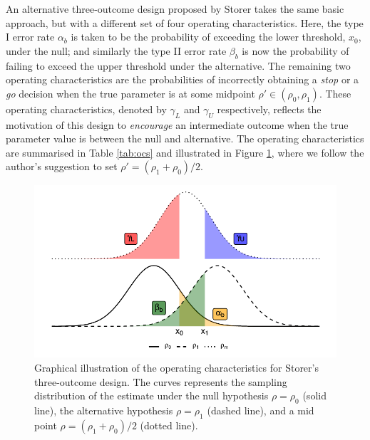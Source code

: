 \documentclass{bmcart}
\begin{document}
An alternative three-outcome design proposed by Storer \cite{Storer1992} takes the same basic approach, but with a different set of four operating characteristics. Here, the type I error rate $\alpha_b$ is taken to be the probability of exceeding the lower threshold, $x_0$, under the null; and similarly the type II error rate $\beta_b$ is now the probability of failing to exceed the upper threshold under the alternative. The remaining two operating characteristics are the probabilities of incorrectly obtaining a \emph{stop} or a \emph{go} decision when the true parameter is at some midpoint $\rho' \in (\rho_0, \rho_1)$. These operating characteristics, denoted by $\gamma_L$ and $\gamma_U$ respectively, reflects the motivation of this design to \emph{encourage} an intermediate outcome when the true parameter value is between the null and alternative. The operating characteristics are summarised in Table \ref{tab:ocs} and illustrated in Figure \ref{fig:Stor_ocs}, where we follow the author's suggestion to set $\rho' = (\rho_1 + \rho_0)/2$.

\begin{figure}
\centering
\includegraphics[scale=0.8]{./figures/Stor_ocs}
\caption{Graphical illustration of the operating characteristics for Storer's three-outcome design\cite{Storer1992}. The curves represents the sampling distribution of the estimate under the null hypothesis $\rho = \rho_0$ (solid line), the alternative hypothesis $\rho = \rho_1$ (dashed line), and a mid point $\rho = (\rho_1 + \rho_0)/2$ (dotted line).}
\label{fig:Stor_ocs}
\end{figure}
\end{document}
